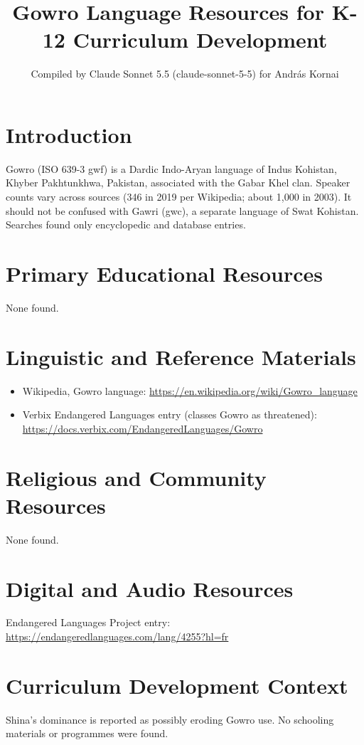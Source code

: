 \documentclass[12pt]{article}
\title{Gowro Language Resources for K-12 Curriculum Development}
\author{Compiled by Claude Sonnet 5.5 (claude-sonnet-5-5) for Andr\'as Kornai}
\date{}
\begin{document}
\maketitle

\section{Introduction}
Gowro (ISO 639-3 gwf) is a Dardic Indo-Aryan language of Indus Kohistan, Khyber Pakhtunkhwa, Pakistan, associated with the Gabar Khel clan. Speaker counts vary across sources (346 in 2019 per Wikipedia; about 1,000 in 2003). It should not be confused with Gawri (gwc), a separate language of Swat Kohistan. Searches found only encyclopedic and database entries.

\section{Primary Educational Resources}
None found.

\section{Linguistic and Reference Materials}
\begin{itemize}
\item Wikipedia, Gowro language: \url{https://en.wikipedia.org/wiki/Gowro_language}
\item Verbix Endangered Languages entry (classes Gowro as threatened): \url{https://docs.verbix.com/EndangeredLanguages/Gowro}
\end{itemize}

\section{Religious and Community Resources}
None found.

\section{Digital and Audio Resources}
Endangered Languages Project entry: \url{https://endangeredlanguages.com/lang/4255?hl=fr}

\section{Curriculum Development Context}
Shina's dominance is reported as possibly eroding Gowro use. No schooling materials or programmes were found.
\end{document}
